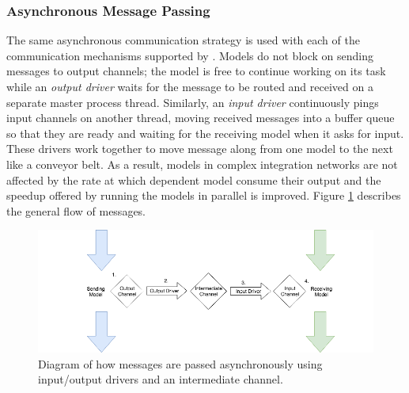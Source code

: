\documentclass[journal]{IEEEtran}
\newcommand{\todo}[1]{{\color{red}{#1}}}
\newcommand{\pkg}{{\tt \todo{cis\_interface}}{}}
\begin{document}
\subsubsection{Asynchronous Message Passing}\label{SSS:async}
%
The same asynchronous communication strategy is used with each of the communication mechanisms supported by {\pkg}. 
Models do not block on sending messages to 
output channels; the model is free to continue working on its task while 
an \emph{output driver} waits for the message to be routed and received on a separate master process thread. Similarly, 
an \emph{input driver} continuously pings input channels on another thread, moving received messages into a 
buffer queue so that they are ready and waiting for the receiving model 
when it asks for input. These drivers work together to move message along from one model to the next like a conveyor belt. 
As a result, models in complex integration networks are not affected by the rate at which dependent model consume their output and the speedup offered by running the models in parallel is improved. Figure \ref{fig:async} describes the general flow of messages.
%
\ifinclfig
 	\begin{figure}[htbp]
	\begin{center}
	\includegraphics[width=\columnwidth,keepaspectratio]{./images/io_drivers.png}
	\caption{Diagram of how messages are passed asynchronously using input/output drivers and an intermediate channel.}
	\label{fig:async}
	\end{center}
	\end{figure}
\fi
%
\end{document}
